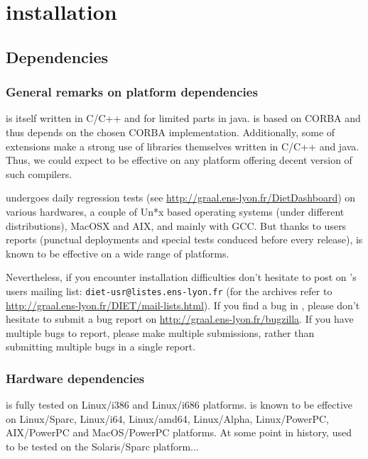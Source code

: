 \chapter{\diet installation}
\label{ch:installing}

\section{Dependencies}
\label{sec:dependencies}

\subsection{General remarks on \diet platform dependencies}

\diet is itself written in C/C++ and for limited parts in java. \diet
is based on CORBA and thus depends on the chosen CORBA implementation.
Additionally, some of \diet extensions make a strong use of libraries
themselves written in C/C++ and java. Thus, we could expect \diet to
be effective on any platform offering decent version of such
compilers.

\diet undergoes daily regression tests (see
\url{http://graal.ens-lyon.fr/DietDashboard}) on various hardwares, a
couple of Un*x based operating systems (under different
distributions), MacOSX and AIX, and mainly with GCC. But thanks to
users reports (punctual deployments and special tests conduced before
every release), \diet is known to be effective on a wide range of
platforms.

Nevertheless, if you encounter installation difficulties don't
hesitate to post on \diet's users mailing list:
\verb+diet-usr@listes.ens-lyon.fr+ (for the archives refer to
\url{http://graal.ens-lyon.fr/DIET/mail-lists.html}).  If you find a
bug in \diet, please don't hesitate to submit a bug report on
\url{http://graal.ens-lyon.fr/bugzilla}. If you have multiple bugs to
report, please make multiple submissions, rather than submitting
multiple bugs in a single report.

\subsection{Hardware dependencies}
\diet is fully tested on Linux/i386 and Linux/i686 platforms. \diet is
known to be effective on Linux/Sparc, Linux/i64, Linux/amd64,
Linux/Alpha, Linux/PowerPC, AIX/PowerPC and MacOS/PowerPC platforms.
At some point in \diet history, \diet used to be tested on the
Solaris/Sparc platform...

